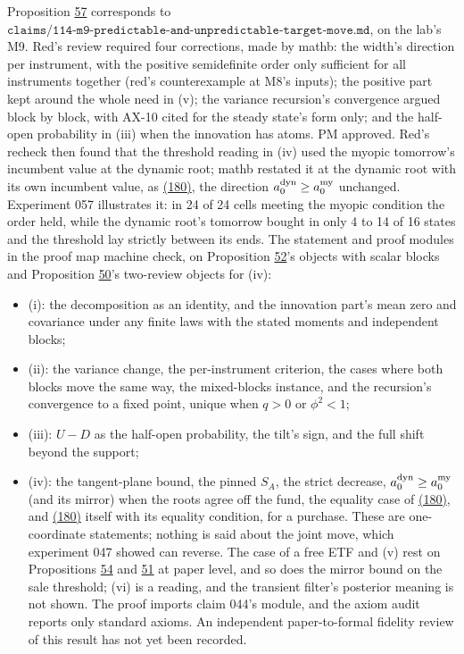 \documentclass[11pt]{article}
\begin{document}
Proposition \hyperref[res:Proposition-57]{57} corresponds to
\(\texttt{claims/114-m9-predictable-and-unpredictable-target-move.md}\), on the lab's
M9. Red's review required four corrections, made by mathb: the width's
direction per instrument, with the positive semidefinite order only
sufficient for all instruments together (red's counterexample at M8's
inputs); the positive part kept around the whole need in (v); the
variance recursion's convergence argued block by block, with AX-10
cited for the steady state's form only; and the half-open probability
in (iii) when the innovation has atoms. PM approved. Red's recheck then
found that the threshold reading in (iv) used the myopic tomorrow's
incumbent value at the dynamic root; mathb restated it at the dynamic
root with its own incumbent value, as \hyperref[eq:180]{(180)}, the direction
\(a^{\rm dyn}_0\geq a^{\rm my}_0\) unchanged. Experiment 057 illustrates it: in 24 of 24 cells
meeting the myopic condition the order held, while the dynamic root's
tomorrow bought in only 4 to 14 of 16 states and the threshold lay
strictly between its ends. The statement and proof modules in the
proof map machine check, on Proposition \hyperref[res:Proposition-52]{52}'s objects with scalar blocks
and Proposition \hyperref[res:Proposition-50]{50}'s two-review objects for (iv):

\begin{itemize}
  \item (i): the decomposition as an identity, and the innovation part's mean
  zero and covariance under any finite laws with the stated moments and
  independent blocks;
  \item (ii): the variance change, the per-instrument criterion, the cases
  where both blocks move the same way, the mixed-blocks instance, and
  the recursion's convergence to a fixed point, unique when \(q>0\) or
  \(\phi^2<1\);
  \item (iii): \(U-D\) as the half-open probability, the tilt's sign, and the full
  shift beyond the support;
  \item (iv): the tangent-plane bound, the pinned \(S_A\), the strict decrease,
  \(a^{\rm dyn}_0\geq a^{\rm my}_0\) (and its mirror) when the roots agree off the fund, the
  equality case of \hyperref[eq:180]{(180)}, and \hyperref[eq:180]{(180)} itself with its equality condition, for a purchase.
These are one-coordinate statements; nothing is said about the joint
move, which experiment 047 showed can reverse. The case of a free ETF
and (v) rest on Propositions \hyperref[res:Proposition-54]{54} and \hyperref[res:Proposition-51]{51} at paper level, and so does
the mirror bound on the sale threshold; (vi) is a reading, and the
transient filter's posterior meaning is not shown.
The proof imports claim 044's module, and the axiom audit reports only
standard axioms. An independent paper-to-formal fidelity review of
this result has not yet been recorded.
\end{itemize}
\end{document}

